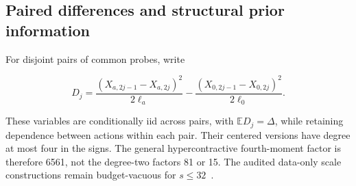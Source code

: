 \subsection{Paired differences and structural prior information}
For disjoint pairs of common probes, write


\begin{equation}
D_j=\frac{(X_{a,2j-1}-X_{a,2j})^2}{2\ell_a}
-\frac{(X_{0,2j-1}-X_{0,2j})^2}{2\ell_0}.
\end{equation}


These variables are conditionally iid across pairs, with $\mathbb ED_j=\Delta$, while retaining dependence between actions within each pair. Their centered versions have degree at most four in the signs. The general hypercontractive fourth-moment factor is therefore 6561, not the degree-two factors 81 or 15. The audited data-only scale constructions remain budget-vacuous for $s\le32$~\cite{project2026}.

